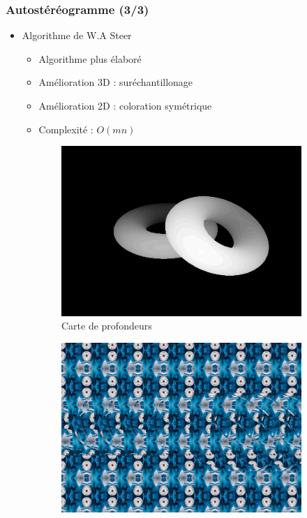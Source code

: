 \documentclass{beamer}
\begin{document}
%
\begin{frame}
\frametitle{Autostéréogramme (3/3)}
\begin{itemize}[label=$\bullet$]
	\item Algorithme de W.A Steer \cite{wasteer}
	\begin{itemize}[label=$\circ$]
	\item Algorithme plus élaboré
	\item Amélioration 3D : suréchantillonage
	\item Amélioration 2D : coloration symétrique
	\item Complexité : $O(mn)$
	\end{itemize}
\end{itemize}
\begin{figure}
\centering
\begin{subfigure}{.4\textwidth}
  \centering
  \includegraphics[width=1\linewidth]{donutdepth.png}
  \caption{Carte de profondeurs}
\end{subfigure}
\begin{subfigure}{.4\textwidth}
  \centering
  \includegraphics[width=1\linewidth]{donut2.png}

\end{subfigure}
\end{figure}
\end{frame}
\end{document}
